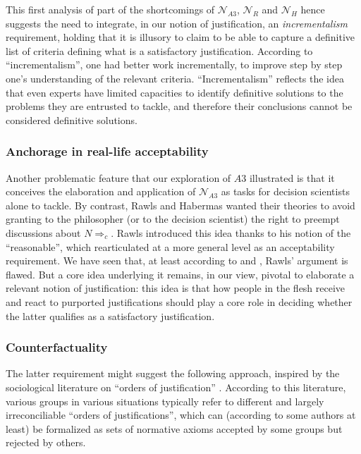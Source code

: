 \documentclass[preprint, french, english, 11pt, authoryear]{elsarticle}%
\begin{document}
This first analysis of part of the shortcomings of $\mathscr{N}_{A3}$, $\mathscr{N}_{R}$ and $\mathscr{N}_{H}$ hence suggests the need to integrate, in our notion of justification, an \emph{incrementalism} requirement, holding that it is illusory to claim to be able to capture a definitive list of criteria defining what is a satisfactory justification. According to “incrementalism”, one had better work incrementally, to improve step by step one's understanding of the relevant criteria. “Incrementalism” reflects the idea that even experts have limited capacities to identify definitive solutions to the problems they are entrusted to tackle, and therefore their conclusions cannot be considered definitive solutions.

\subsubsection{Anchorage in real-life acceptability}
Another problematic feature that our exploration of $A3$ illustrated is that it conceives the elaboration and application of $\mathscr{N}_{A3}$ as tasks for decision scientists alone to tackle. By contrast, Rawls and Habermas wanted their theories to avoid granting to the philosopher (or to the decision scientist) the right to preempt discussions about $N⇒_c$. Rawls introduced this idea thanks to his notion of the ``reasonable'', which \cite{estlund_democratic_2009} rearticulated at a more general level as an acceptability requirement. We have seen that, at least according to \cite{habermas_reconciliation_1995} and \cite{estlund_democratic_2009}, Rawls' argument is flawed. But a core idea underlying it remains, in our view, pivotal to elaborate a relevant notion of justification: this idea is that how people in the flesh receive and react to purported justifications should play a core role in deciding whether the latter qualifies as a satisfactory justification.

\subsubsection{Counterfactuality}
The latter requirement might suggest the following approach, inspired by the sociological literature on “orders of justification” \citep{boltanski_justification_2006}. According to this literature, various groups in various situations typically refer to different and largely irreconciliable “orders of justifications”, which can (according to some authors at least) be formalized as sets of normative axioms accepted by some groups but rejected by others.
\end{document}
